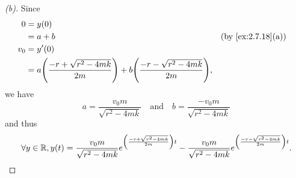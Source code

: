 \begin{proof}[(b)]
	Since
	\begin{align*}
		0   & = y(0)                                                                                                      \\
		    & = a + b                                                                              &  & \by{ex:2.7.18}[a] \\
		v_0 & = y'(0)                                                                                                     \\
		    & = a \pa{\frac{-r + \sqrt{r^2 - 4mk}}{2m}} + b \pa{\frac{-r - \sqrt{r^2 - 4mk}}{2m}},
	\end{align*}
	we have
	\[
		a = \frac{v_0 m}{\sqrt{r^2 - 4mk}} \quad \text{and} \quad b = \frac{-v_0 m}{\sqrt{r^2 - 4mk}}
	\]
	and thus
	\[
		\forall y \in \mathbb{R}, y(t) = \frac{v_0 m}{\sqrt{r^2 - 4mk}} e^{\left\lparen\frac{-r + \sqrt{r^2 - 4mk}}{2m}\right\rparen t} - \frac{v_0 m}{\sqrt{r^2 - 4mk}} e^{\left\lparen\frac{-r - \sqrt{r^2 - 4mk}}{2m}\right\rparen t}.
	\]
\end{proof}


